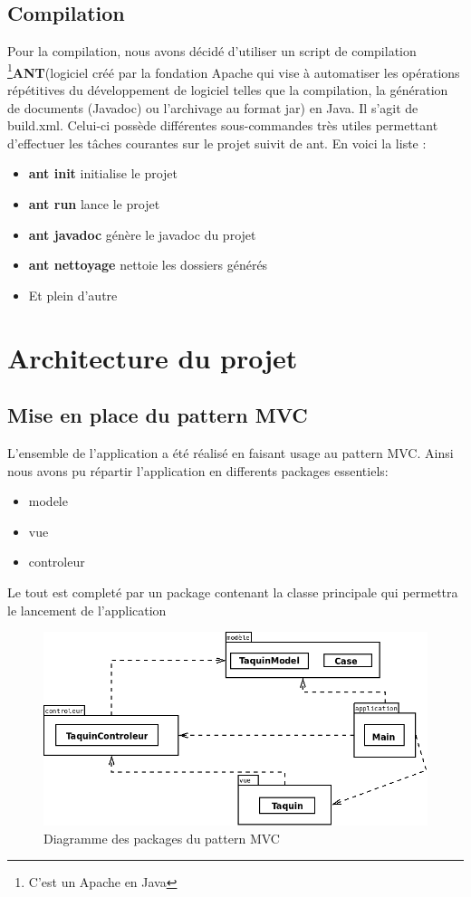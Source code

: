 \documentclass[12pt]{article}
\begin{document}
\subsection{Compilation}
Pour la compilation, nous avons décidé d'utiliser un script de compilation \footnote{C'est un Apache en Java}\textbf{ANT}(logiciel créé par la fondation Apache qui vise à automatiser les opérations répétitives du développement de logiciel telles que la compilation, la génération de documents (Javadoc) ou l'archivage au format jar) en Java. Il s'agit de build.xml. Celui-ci possède différentes sous-commandes très utiles permettant d’effectuer
les tâches courantes sur le projet suivit de ant. En voici la liste :
\begin{itemize}
    \item \textbf{ant init} initialise le projet
    \item \textbf{ant run}  lance le projet
    \item \textbf{ant javadoc} génère le javadoc du projet
    \item \textbf{ant nettoyage} nettoie les dossiers générés
    \item Et plein d'autre
\end{itemize}

\section{Architecture du projet}
\subsection{Mise en place du pattern MVC}
L'ensemble de l'application a été réalisé en faisant usage au pattern MVC. Ainsi nous avons pu répartir
l'application en differents packages essentiels:
\begin{itemize}
	\item modele
	\item vue
	\item controleur
\end{itemize}
Le tout est completé par un package contenant la classe principale qui permettra le lancement de l'application
\begin{figure}[h!]
	\centering
	\includegraphics[scale=0.5]{images/DiagrammePackage.png}
	\caption{Diagramme des packages du pattern MVC}
\end{figure}
\end{document}
